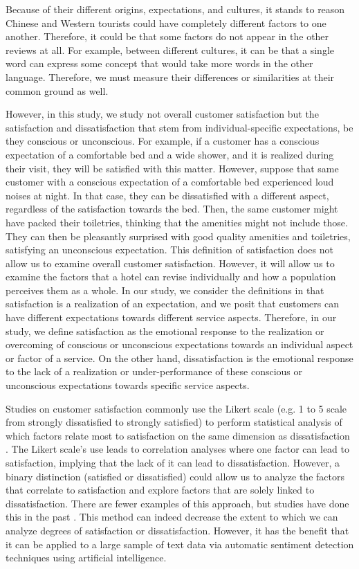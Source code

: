 \documentclass[smallextended,natbib]{svjour3}       %
\begin{document}
    Because of their different origins, expectations, and cultures, it stands to reason Chinese and Western tourists could have completely different factors to one another. Therefore, it could be that some factors do not appear in the other reviews at all. For example, between different cultures, it can be that a single word can express some concept that would take more words in the other language. Therefore, we must measure their differences or similarities at their common ground as well.

    However, in this study, we study not overall customer satisfaction but the satisfaction and dissatisfaction that stem from individual-specific expectations, be they conscious or unconscious. For example, if a customer has a conscious expectation of a comfortable bed and a wide shower, and it is realized during their visit, they will be satisfied with this matter. However, suppose that same customer with a conscious expectation of a comfortable bed experienced loud noises at night. In that case, they can be dissatisfied with a different aspect, regardless of the satisfaction towards the bed. Then, the same customer might have packed their toiletries, thinking that the amenities might not include those. They can then be pleasantly surprised with good quality amenities and toiletries, satisfying an unconscious expectation. This definition of satisfaction does not allow us to examine overall customer satisfaction. However, it will allow us to examine the factors that a hotel can revise individually and how a population perceives them as a whole. In our study, we consider the definitions in \cite{hunt1975} that satisfaction is a realization of an expectation, and we posit that customers can have different expectations towards different service aspects. Therefore, in our study, we define satisfaction as the emotional response to the realization or overcoming of conscious or unconscious expectations towards an individual aspect or factor of a service. On the other hand, dissatisfaction is the emotional response to the lack of a realization or under-performance of these conscious or unconscious expectations towards specific service aspects.

    Studies on customer satisfaction \cite[e.g.][]{truong2009, romao2014, wu2009} commonly use the Likert scale \cite[][]{likert1932technique} (e.g. 1 to 5 scale from strongly dissatisfied to strongly satisfied) to perform statistical analysis of which factors relate most to satisfaction on the same dimension as dissatisfaction \cite[e.g.][]{chan201518, choi2000}. The Likert scale's use leads to correlation analyses where one factor can lead to satisfaction, implying that the lack of it can lead to dissatisfaction. However, a binary distinction (satisfied or dissatisfied) could allow us to analyze the factors that correlate to satisfaction and explore factors that are solely linked to dissatisfaction. There are fewer examples of this approach, but studies have done this in the past \cite[e.g.][]{zhou2014}. This method can indeed decrease the extent to which we can analyze degrees of satisfaction or dissatisfaction. However, it has the benefit that it can be applied to a large sample of text data via automatic sentiment detection techniques using artificial intelligence. 
\end{document}
